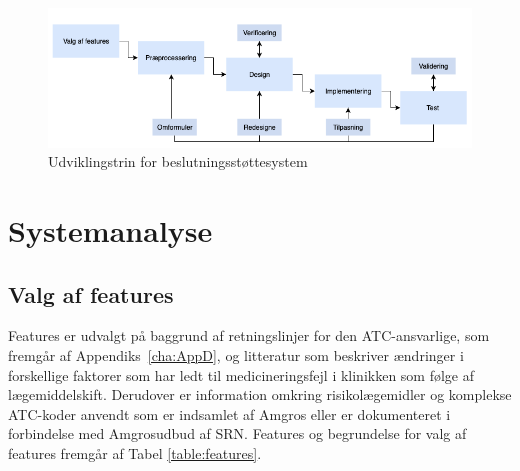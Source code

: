 \begin{figure}[H]\centering	\includegraphics[width=1\textwidth]{billeder/udviklingstrin.png} 
	\caption{Udviklingstrin for beslutningsstøttesystem}
	\label{fig:metode}  
\end{figure}
\vspace{-0.5cm}


\chapter{Systemanalyse}
\section{Valg af features}
Features er udvalgt på baggrund af retningslinjer for den ATC-ansvarlige, som fremgår af Appendiks~\ref{cha:AppD}, og litteratur som beskriver ændringer i forskellige faktorer som har ledt til medicineringsfejl i klinikken som følge af lægemiddelskift. Derudover er information omkring risikolægemidler og komplekse ATC-koder anvendt som er indsamlet af Amgros eller er dokumenteret i forbindelse med Amgrosudbud af SRN.
Features og begrundelse for valg af features fremgår af Tabel \ref{table:features}.

